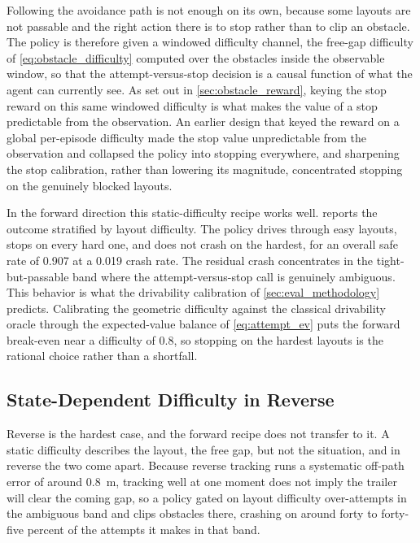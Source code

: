 Following the avoidance path is not enough on its own, because some layouts are not passable and the right action there is to stop rather than to clip an obstacle. The policy is therefore given a windowed difficulty channel, the free-gap difficulty of \cref{eq:obstacle_difficulty} computed over the obstacles inside the observable window, so that the attempt-versus-stop decision is a causal function of what the agent can currently see. As set out in \cref{sec:obstacle_reward}, keying the stop reward on this same windowed difficulty is what makes the value of a stop predictable from the observation. An earlier design that keyed the reward on a global per-episode difficulty made the stop value unpredictable from the observation and collapsed the policy into stopping everywhere, and sharpening the stop calibration, rather than lowering its magnitude, concentrated stopping on the genuinely blocked layouts.

In the forward direction this static-difficulty recipe works well.  reports the outcome stratified by layout difficulty. The policy drives through easy layouts, stops on every hard one, and does not crash on the hardest, for an overall safe rate of 0.907 at a 0.019 crash rate. The residual crash concentrates in the tight-but-passable band where the attempt-versus-stop call is genuinely ambiguous. This behavior is what the drivability calibration of \cref{sec:eval_methodology} predicts. Calibrating the geometric difficulty against the classical drivability oracle through the expected-value balance of \cref{eq:attempt_ev} puts the forward break-even near a difficulty of $0.8$, so stopping on the hardest layouts is the rational choice rather than a shortfall.



\subsection{State-Dependent Difficulty in Reverse}

Reverse is the hardest case, and the forward recipe does not transfer to it. A static difficulty describes the layout, the free gap, but not the situation, and in reverse the two come apart. Because reverse tracking runs a systematic off-path error of around $0.8$~m, tracking well at one moment does not imply the trailer will clear the coming gap, so a policy gated on layout difficulty over-attempts in the ambiguous band and clips obstacles there, crashing on around forty to forty-five percent of the attempts it makes in that band.

